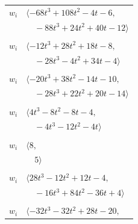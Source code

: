 \documentclass[11pt]{article}
\begin{document}
\begin{longtable}{@{}ll@{}}
$w_i$ & $\langle -68t^{3}+108t^{2}-4t-6,$\\
 & $\quad -88t^{3}+24t^{2}+40t-12\rangle$\\
\addlinespace[2pt]
\multicolumn{2}{@{}p{0.97\textwidth}@{}}{$i=34$, $D_i=4$, $\rho_{ij}$: $7{:}1, \allowbreak 19{:}2, \allowbreak 23{:}2, \allowbreak 24{:}2, \allowbreak 26{:}2, \allowbreak 31{:}1, \allowbreak 43{:}1, \allowbreak 48{:}1$}\\
$w_i$ & $\langle -12t^{3}+28t^{2}+18t-8,$\\
 & $\quad -28t^{3}-4t^{2}+34t-4\rangle$\\
\addlinespace[2pt]
\multicolumn{2}{@{}p{0.97\textwidth}@{}}{$i=35$, $D_i=2$, $\rho_{ij}$: $1{:}2, \allowbreak 3{:}1, \allowbreak 4{:}2, \allowbreak 12{:}2, \allowbreak 26{:}2, \allowbreak 30{:}1, \allowbreak 44{:}1$}\\
$w_i$ & $\langle -20t^{3}+38t^{2}-14t-10,$\\
 & $\quad -28t^{3}+22t^{2}+20t-14\rangle$\\
\addlinespace[2pt]
\multicolumn{2}{@{}p{0.97\textwidth}@{}}{$i=36$, $D_i=4$, $\rho_{ij}$: $7{:}1, \allowbreak 8{:}1, \allowbreak 9{:}1, \allowbreak 26{:}1, \allowbreak 29{:}1, \allowbreak 33{:}1, \allowbreak 46{:}1, \allowbreak 47{:}1$}\\
$w_i$ & $\langle 4t^{3}-8t^{2}-8t-4,$\\
 & $\quad -4t^{3}-12t^{2}-4t\rangle$\\
\addlinespace[2pt]
\multicolumn{2}{@{}p{0.97\textwidth}@{}}{$i=37$, $D_i=1$, $\rho_{ij}$: $4{:}2, \allowbreak 18{:}2, \allowbreak 24{:}2, \allowbreak 50{:}2$}\\
$w_i$ & $\langle 8,$\\
 & $\quad 5\rangle$\\
\addlinespace[2pt]
\multicolumn{2}{@{}p{0.97\textwidth}@{}}{$i=38$, $D_i=4$, $\rho_{ij}$: $0{:}2, \allowbreak 2{:}1, \allowbreak 12{:}2, \allowbreak 16{:}2, \allowbreak 24{:}2, \allowbreak 27{:}1, \allowbreak 28{:}2, \allowbreak 29{:}2, \allowbreak 46{:}1, \allowbreak 48{:}1$}\\
$w_i$ & $\langle 28t^{3}-12t^{2}+12t-4,$\\
 & $\quad -16t^{3}+84t^{2}-36t+4\rangle$\\
\addlinespace[2pt]
\multicolumn{2}{@{}p{0.97\textwidth}@{}}{$i=39$, $D_i=4$, $\rho_{ij}$: $5{:}2, \allowbreak 7{:}2, \allowbreak 15{:}1, \allowbreak 23{:}2, \allowbreak 32{:}2, \allowbreak 33{:}1, \allowbreak 45{:}2, \allowbreak 46{:}1$}\\
$w_i$ & $\langle -32t^{3}-32t^{2}+28t-20,$\\

\end{longtable}
\end{document}
